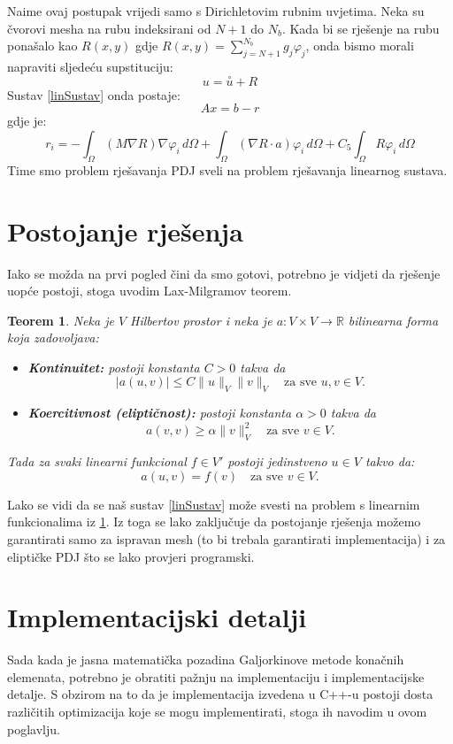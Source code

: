 \documentclass[zavrsnirad]{../fer}
\newtheorem{teorem}{Teorem}
\begin{document}
Naime ovaj postupak vrijedi samo s Dirichletovim
rubnim uvjetima. Neka su čvorovi mesha na rubu indeksirani
od $N+1$ do $N_b$.
Kada bi se rješenje na rubu ponašalo kao
$R(x,y)$ gdje $R(x,y) = \sum_{j=N + 1}^{N_b} g_j \varphi_j$,
onda bismo morali napraviti sljedeću
supstituciju:
$$u = \overset{\circ}u + R$$
Sustav \ref{linSustav}
onda postaje:
$$Ax = b - r$$
gdje je:
$$r_i = - \int_{\Omega}(M\nabla R) \nabla \varphi_i \, d \Omega +
\int_{\Omega}(\nabla R \cdot a) \varphi_i \, d \Omega +
C_5 \int_{\Omega} R \varphi_i\, d\Omega
$$
Time smo problem rješavanja PDJ sveli na problem
rješavanja linearnog sustava.
\section{Postojanje rješenja}
\label{postojanje}
Iako se možda na prvi pogled čini da smo gotovi, potrebno 
je vidjeti da rješenje uopće postoji, stoga uvodim 
Lax-Milgramov teorem.
\begin{teorem}
  \label{laxMil}
Neka je $ V $ Hilbertov prostor i neka je $ a: V \times V \rightarrow \mathbb{R} $ bilinearna forma koja zadovoljava:
\begin{itemize}
    \item \textbf{Kontinuitet:} postoji konstanta $ C > 0 $ takva da
    $$
    |a(u, v)| \leq C \|u\|_V \|v\|_V \quad \text{za sve } u, v \in V.
    $$
    
    \item \textbf{Koercitivnost (eliptičnost):} postoji konstanta $ \alpha > 0 $ takva da
    $$
    a(v, v) \geq \alpha \|v\|_V^2 \quad \text{za sve } v \in V.
    $$
\end{itemize}

Tada za svaki linearni funkcional $ f \in V' $ postoji jedinstveno $ u \in V $ takvo da:
$$
a(u, v) = f(v) \quad \text{za sve } v \in V.
$$
\end{teorem}
Lako se vidi da se naš sustav \ref{linSustav} 
može svesti na problem s linearnim funkcionalima iz
\ref{laxMil}. Iz toga se lako zaključuje da
postojanje rješenja možemo garantirati samo za ispravan mesh
(to bi trebala garantirati implementacija) i za eliptičke PDJ što se lako provjeri programski.

\newpage
\section{Implementacijski detalji}
\label{implementacijaOpis}
Sada kada je jasna matematička pozadina 
Galjorkinove metode konačnih elemenata, potrebno je 
obratiti pažnju na implementaciju i implementacijske detalje.
S obzirom na to da je implementacija izvedena u C++-u postoji
dosta različitih optimizacija koje se mogu implementirati,
stoga ih navodim u ovom poglavlju.
\end{document}
